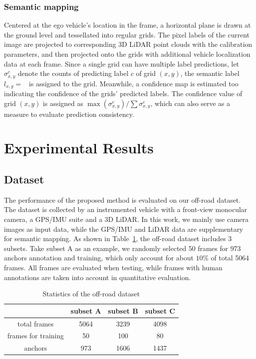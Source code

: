 \documentclass[letterpaper, 10 pt, conference]{ieeeconf}  %
\begin{document}
\subsubsection{Semantic mapping} \label{3_SM}

Centered at the ego vehicle's location in the frame, a horizontal plane is drawn at the ground level and tessellated into regular grids. The pixel labels of the current image are projected to corresponding 3D LiDAR point clouds with the calibration parameters, and then projected onto the grids with additional vehicle localization data at each frame. Since a single grid can have multiple label predictions, let $\sigma_{x,y}^c$ denote the counts of predicting label $c$ of grid $(x,y)$, the semantic label $l_{x,y}=\mathop{\text{argmax}_{c} (\sigma_{x,y}^c)}$ is assigned to the grid. Meanwhile, a confidence map is estimated too indicating the confidence of the grids' predicted labels. The confidence value of grid $(x,y)$ is assigned as $\max(\sigma_{x,y}^c)/\sum{\sigma_{x,y}^c}$, which can also serve as a measure to evaluate prediction consistency.

\section{Experimental Results}	\label{exp}
\subsection{Dataset}
The performance of the proposed method is evaluated on our off-road dataset. The dataset is collected by an instrumented vehicle with a front-view monocular camera, a GPS/IMU suite and a 3D LiDAR. In this work, we mainly use camera images as input data, while the GPS/IMU and LiDAR data are supplementary for semantic mapping.
As shown in Table~\ref{tab:dataset}, the off-road dataset includes 3 subsets. Take subset A as an example, we randomly selected 50 frames for 973 anchors annotation and training, which only account for about $10\%$ of total 5064 frames. All frames are evaluated when testing, while frames with human annotations are taken into account in quantitative evaluation.

\begin{table}[]
	\centering
	\caption{Statistics of the off-road dataset}
	\label{tab:dataset}
	\begin{tabular}{cccc} 
		\hline
		& subset A & subset B & subset C  \\ 
		\hline
		total frames        & 5064     & 3239     & 4098      \\
		frames for training & 50       & 100      & 80        \\
		anchors       & 973      & 1606     & 1437      \\
		\hline
	\end{tabular}
\end{table}
\end{document}
